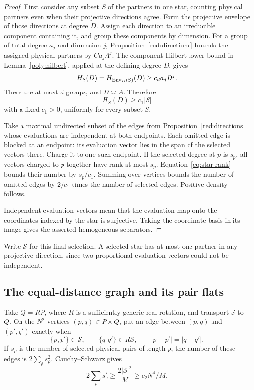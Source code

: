 \begin{proof}
First consider any subset \(S\) of the partners in one star, counting
physical partners even when their projective directions agree.
Form the projective envelope of those directions at degree \(D\).
Assign each direction to an irreducible component containing it, and
group these components by dimension. For a group of total degree \(a_j\)
and dimension \(j\), Proposition~\ref{red:directions} bounds the assigned
physical partners by \(C a_j A^j\). The component Hilbert lower bound
in Lemma~\ref{poly:hilbert}, applied at the defining degree \(D\), gives
\[
 H_S(D)=H_{\operatorname{Env}_D(S)}(D)\ge c_d a_jD^j.
\]
There are at most \(d\) groups, and \(D\asymp A\). Therefore
\begin{equation}\label{eq:star-rank}
 H_S(D)\ge c_1|S|
\end{equation}
with a fixed \(c_1>0\), uniformly for every subset \(S\).

Take a maximal undirected subset of the edges from
Proposition~\ref{red:directions} whose evaluations are independent at
both endpoints. Each omitted edge is blocked at an endpoint: its
evaluation vector lies in the span of the selected vectors there.
Charge it to one such endpoint. If the selected degree at \(p\) is
\(s_p\), all vectors charged to \(p\) together have rank at most \(s_p\).
Equation~\eqref{eq:star-rank} bounds their number by \(s_p/c_1\).
Summing over vertices bounds the number of omitted edges by
\(2/c_1\) times the number of selected edges. Positive density follows.

Independent evaluation vectors mean that the evaluation map onto the
coordinates indexed by the star is surjective. Taking the coordinate
basis in its image gives the asserted homogeneous separators.
\end{proof}

Write \(\mathcal S\) for this final selection. A selected star has at
most one partner in any projective direction, since two proportional
evaluation vectors could not be independent.

\subsection{The equal-distance graph and its pair flats}

Take \(Q=RP\), where \(R\) is a sufficiently generic real rotation,
and transport \(\mathcal S\) to \(Q\).
On the \(N^2\) vertices \((p,q)\in P\times Q\), put an edge between
\((p,q)\) and \((p',q')\) exactly when
\[
 \{p,p'\}\in\mathcal S,\qquad
 \{q,q'\}\in R\mathcal S,\qquad |p-p'|=|q-q'|.
\]
If \(s_\rho\) is the number of selected physical pairs of length
\(\rho\), the number of these edges is
\(2\sum_\rho s_\rho^2\). Cauchy--Schwarz gives
\begin{equation}\label{eq:equality-edges}
 2\sum_\rho s_\rho^2
 \ge \frac{2|\mathcal S|^2}{M}
 \ge c_2 N^4/M.
\end{equation}

